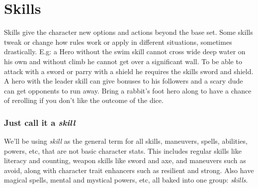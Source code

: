 




\cleardoublepage

\chapter*{Skills}
Skills give the character new options and actions beyond the base set. Some skills tweak or change how rules work or apply in different situations, sometimes drastically. E.g: a Hero without the swim skill cannot cross wide deep water on his own and without climb he cannot get over a significant wall. To be able to attack with a sword or parry with a shield he requires the skills sword and shield. A hero with the leader skill can give bonuses to his followers and a scary dude can get opponents to run away. Bring a rabbit's foot hero along to have a chance of rerolling if you don't like the outcome of the dice.


\subsection*{Just call it a \textit{skill}}
We'll be using \emph{skill} as the general term for all skills, maneuvers, spells, abilities, powers, etc, that are not basic character stats. This includes regular skills like literacy and counting, weapon skills like sword and axe, and maneuvers such as avoid, along with character trait enhancers such as resilient and strong. Also have magical spells, mental and mystical powers, etc, all baked into one group: \emph{skills}.


